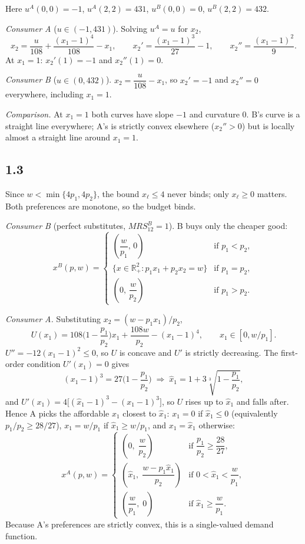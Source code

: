\documentclass[12pt,letterpaper]{article}
\begin{document}
Here $u^A(0,0)=-1$, $u^A(2,2)=431$, $u^B(0,0)=0$, $u^B(2,2)=432$.

\textit{Consumer A} ($u\in(-1,431)$). Solving $u^A=u$ for $x_2$,
\[
x_2 = \frac{u}{108} + \frac{(x_1-1)^4}{108} - x_1, \qquad
x_2' = \frac{(x_1-1)^3}{27} - 1, \qquad
x_2'' = \frac{(x_1-1)^2}{9}.
\]
At $x_1=1$: $x_2'(1)=-1$ and $x_2''(1)=0$.

\textit{Consumer B} ($u\in(0,432)$). $x_2 = \dfrac{u}{108} - x_1$, so $x_2'=-1$ and $x_2''=0$ everywhere, including $x_1=1$.

\textit{Comparison.} At $x_1=1$ both curves have slope $-1$ and curvature $0$. B's curve is a straight line everywhere; A's is strictly convex elsewhere ($x_2''>0$) but is locally almost a straight line around $x_1=1$.

\subsection*{1.3}

Since $w<\min\{4p_1,4p_2\}$, the bound $x_\ell\le 4$ never binds; only $x_\ell\ge0$ matters. Both preferences are monotone, so the budget binds.

\textit{Consumer B} (perfect substitutes, $MRS^B_{12}=1$). B buys only the cheaper good:
\[
x^B(p,w)=\begin{cases}
\left(\dfrac{w}{p_1},\,0\right) & \text{if } p_1<p_2,\\[8pt]
\{x\in\mathbb{R}^2_+ : p_1x_1+p_2x_2=w\} & \text{if } p_1=p_2,\\[8pt]
\left(0,\,\dfrac{w}{p_2}\right) & \text{if } p_1>p_2 .
\end{cases}
\]

\textit{Consumer A.} Substituting $x_2=(w-p_1x_1)/p_2$,
\[
U(x_1) = 108\Big(1-\frac{p_1}{p_2}\Big)x_1 + \frac{108w}{p_2} - (x_1-1)^4, \qquad x_1\in[0,w/p_1].
\]
$U''=-12(x_1-1)^2\le0$, so $U$ is concave and $U'$ is strictly decreasing. The first-order condition $U'(x_1)=0$ gives
\[
(x_1-1)^3 = 27\Big(1-\frac{p_1}{p_2}\Big) \;\Longrightarrow\; \hat x_1 = 1+3\sqrt[3]{1-\frac{p_1}{p_2}},
\]
and $U'(x_1)=4\big[(\hat x_1-1)^3-(x_1-1)^3\big]$, so $U$ rises up to $\hat x_1$ and falls after. Hence A picks the affordable $x_1$ closest to $\hat x_1$: $x_1=0$ if $\hat x_1\le0$ (equivalently $p_1/p_2\ge 28/27$), $x_1=w/p_1$ if $\hat x_1\ge w/p_1$, and $x_1=\hat x_1$ otherwise:
\[
x^A(p,w)=\begin{cases}
\left(0,\;\dfrac{w}{p_2}\right) & \text{if } \dfrac{p_1}{p_2}\ge\dfrac{28}{27},\\[12pt]
\left(\hat x_1,\;\dfrac{w-p_1\hat x_1}{p_2}\right) & \text{if } 0<\hat x_1<\dfrac{w}{p_1},\\[12pt]
\left(\dfrac{w}{p_1},\;0\right) & \text{if } \hat x_1\ge\dfrac{w}{p_1}.
\end{cases}
\]
Because A's preferences are strictly convex, this is a single-valued demand function.
\end{document}
